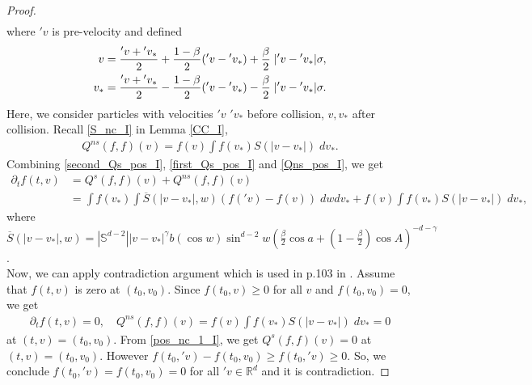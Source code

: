 \documentclass[reqno,10pt]{amsart}
\numberwithin{equation}{section}
\begin{document}
\begin{proof}
\begin{align}
\end{align}
where ${'v}$ is pre-velocity and defined 
\begin{align*} 
    v=\frac{'v+{'v_*}}{2}+\frac{1-\beta}{2}('v-{'v_*})+\frac{\beta}{2}\;|'v-{'v_*}|{\sigma}, \notag\\
     v_*=\frac{'v+{'v_*}}{2}-\frac{1-\beta}{2}('v-{'v_*})-\frac{\beta}{2}\;|'v-{'v_*}|{\sigma}.
\end{align*} Here, we consider particles with velocities $'v$ $'v_*$ before collision, $v,v_*$ after collision. Recall  \eqref{S_nc_I} in Lemma \ref{CC_I}, 
\begin{align} \label{Qns_pos_I}
    Q^{ns}(f, f)(v) =f(v)\int f(v_*)S(|v-v_*|)  \;dv_*. 
\end{align} Combining \eqref{second_Qs_pos_I}, \eqref{first_Qs_pos_I} and \eqref{Qns_pos_I}, we get 
\begin{align} 
    \partial_t f(t,v) &= Q^{s}(f,f)(v) + Q^{ns}(f,f)(v) \label{pos_nc_1_I} \\ 
&=\int f(v_*) \int \overline{S}(|v-v_*|,w)(f('v)-f(v))\; dwdv_* 
+ f(v)\int f(v_*)S(|v-v_*|)  \;dv_*, \label{pos_nc_2_I}
\end{align}
where $\overline{S}(|v-v_*|,w)=|\mathbb{S}^{d-2}||v-v_*|^{\gamma}b(\cos w)\sin^{d-2}w (\frac{\beta}{2}\cos a + (1-\frac{\beta}{2})\cos A)^{-d-\gamma}$. \\

\noindent Now, we can apply contradiction argument which is used in p.103 in \cite{V2002}. Assume that $f(t,v)$ is zero at $(t_0,v_0)$. Since $f(t_0,v) \geq 0$ for all $v$ and  $f(t_0,v_0)=0$, we get 
\begin{align*}
    \partial_t f(t,v) = 0, \quad Q^{ns}(f,f)(v) = f(v)\int f(v_*)S(|v-v_*|)  \;dv_* =0
\end{align*} at $(t,v)=(t_0,v_0).$ From \eqref{pos_nc_1_I}, we get
$Q^{s}(f,f)(v)=0$ at $(t,v)=(t_0,v_0).$ However $f(t_0,{'v})-f(t_0,v_0) \geq f(t_0,{'v}) \geq 0.$ So, we conclude $f(t_0,{'v})=f(t_0,v_0)=0$ for all ${'v} \in \mathbb{R}^d$ and it is contradiction. 
\end{proof} \vspace{3mm}
\end{document}
